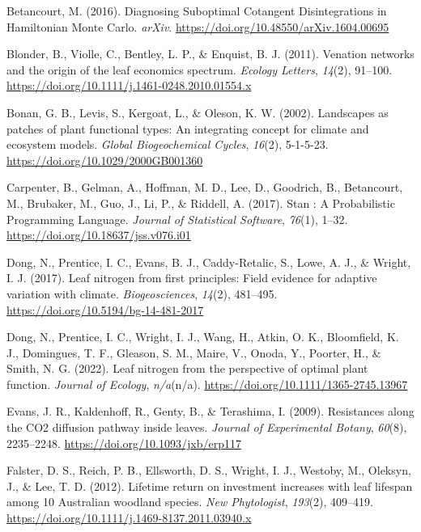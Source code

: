 \documentclass[
  12pt,
  a4paper,
,tablecaptionabove
]{scrartcl}
\newlength{\cslhangindent}
\newenvironment{CSLReferences}[2] %
 {%
  \setlength{\parindent}{0pt}
  \ifodd #1 \everypar{\setlength{\hangindent}{\cslhangindent}}\ignorespaces\fi
  \ifnum #2 > 0
  \setlength{\parskip}{#2\baselineskip}
  \fi
 }%
 {}
\begin{document}
\hypertarget{refs}{}
\begin{CSLReferences}{1}{0}
\leavevmode{}%
Betancourt, M. (2016). Diagnosing {Suboptimal Cotangent Disintegrations}
in {Hamiltonian Monte Carlo}. \emph{arXiv}.
\url{https://doi.org/10.48550/arXiv.1604.00695}

\leavevmode{}%
Blonder, B., Violle, C., Bentley, L. P., \& Enquist, B. J. (2011).
Venation networks and the origin of the leaf economics spectrum.
\emph{Ecology Letters}, \emph{14}(2), 91--100.
\url{https://doi.org/10.1111/j.1461-0248.2010.01554.x}

\leavevmode{}%
Bonan, G. B., Levis, S., Kergoat, L., \& Oleson, K. W. (2002).
Landscapes as patches of plant functional types: {An} integrating
concept for climate and ecosystem models. \emph{Global Biogeochemical
Cycles}, \emph{16}(2), 5-1-5-23.
\url{https://doi.org/10.1029/2000GB001360}

\leavevmode{}%
Carpenter, B., Gelman, A., Hoffman, M. D., Lee, D., Goodrich, B.,
Betancourt, M., Brubaker, M., Guo, J., Li, P., \& Riddell, A. (2017).
Stan : {A Probabilistic Programming Language}. \emph{Journal of
Statistical Software}, \emph{76}(1), 1--32.
\url{https://doi.org/10.18637/jss.v076.i01}

\leavevmode{}%
Dong, N., Prentice, I. C., Evans, B. J., Caddy-Retalic, S., Lowe, A. J.,
\& Wright, I. J. (2017). Leaf nitrogen from first principles: Field
evidence for adaptive variation with climate. \emph{Biogeosciences},
\emph{14}(2), 481--495. \url{https://doi.org/10.5194/bg-14-481-2017}

\leavevmode{}%
Dong, N., Prentice, I. C., Wright, I. J., Wang, H., Atkin, O. K.,
Bloomfield, K. J., Domingues, T. F., Gleason, S. M., Maire, V., Onoda,
Y., Poorter, H., \& Smith, N. G. (2022). Leaf nitrogen from the
perspective of optimal plant function. \emph{Journal of Ecology},
\emph{n/a}(n/a). \url{https://doi.org/10.1111/1365-2745.13967}

\leavevmode{}%
Evans, J. R., Kaldenhoff, R., Genty, B., \& Terashima, I. (2009).
Resistances along the {CO2} diffusion pathway inside leaves.
\emph{Journal of Experimental Botany}, \emph{60}(8), 2235--2248.
\url{https://doi.org/10.1093/jxb/erp117}

\leavevmode{}%
Falster, D. S., Reich, P. B., Ellsworth, D. S., Wright, I. J., Westoby,
M., Oleksyn, J., \& Lee, T. D. (2012). Lifetime return on investment
increases with leaf lifespan among 10 {Australian} woodland species.
\emph{New Phytologist}, \emph{193}(2), 409--419.
\url{https://doi.org/10.1111/j.1469-8137.2011.03940.x}


\end{CSLReferences}
\end{document}
